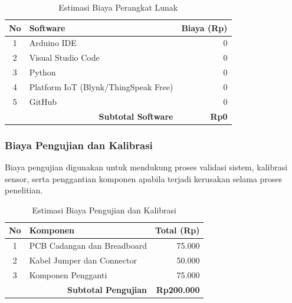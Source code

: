 \documentclass{elsinta}
\begin{document}
\begin{table}[H]
\centering
\caption{Estimasi Biaya Perangkat Lunak}
\label{tab:biaya-software}

\begin{tabular}{|c|p{8cm}|r|}
\hline
\textbf{No} &
\centering\textbf{Software} &
\textbf{Biaya (Rp)}\\
\hline

1 & Arduino IDE & 0\\
\hline
2 & Visual Studio Code & 0\\
\hline
3 & Python & 0\\
\hline
4 & Platform IoT (Blynk/ThingSpeak Free) & 0\\
\hline
5 & GitHub & 0\\
\hline

\multicolumn{2}{|r|}{\textbf{Subtotal Software}} &
\textbf{Rp0}\\
\hline

\end{tabular}
\end{table}


\subsubsection{Biaya Pengujian dan Kalibrasi}

Biaya pengujian digunakan untuk mendukung proses validasi sistem, kalibrasi sensor, serta penggantian komponen apabila terjadi kerusakan selama proses penelitian.

\begin{table}[H]
\centering
\caption{Estimasi Biaya Pengujian dan Kalibrasi}
\label{tab:pengujian}

\begin{tabular}{|c|p{8cm}|r|}
\hline
\textbf{No} &
\centering\textbf{Komponen} &
\textbf{Total (Rp)}\\
\hline

1 & PCB Cadangan dan Breadboard & 75.000\\
\hline
2 & Kabel Jumper dan Connector & 50.000\\
\hline
3 & Komponen Pengganti & 75.000\\
\hline

\multicolumn{2}{|r|}{\textbf{Subtotal Pengujian}} &
\textbf{Rp200.000}\\
\hline

\end{tabular}
\end{table}
\end{document}
